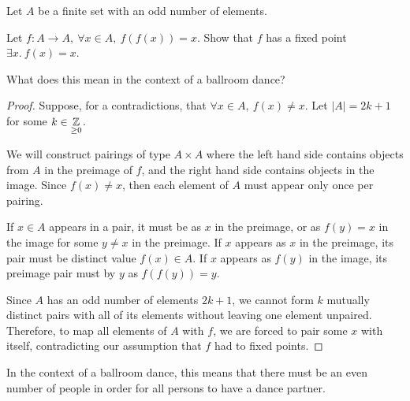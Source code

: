 \documentclass[../hw1]{subfiles}
\begin{document}
\begin{problem}
Let $A$ be a finite set with an odd number of elements.

Let $f:A\longrightarrow A, \ \forall x\in A,\ f(f(x))=x$. Show that $f$ has a fixed point $\exists x.\ f(x)=x$.

What does this mean in the context of a ballroom dance?
\end{problem}
\begin{proof}
	Suppose, for a contradictions, that $\forall x \in A,\ f(x)\neq x$. Let $|A| = 2k+1$ for some $k\in \underset{\ge 0}{\mathbb{Z}}$.

	We will construct pairings of type $A\times A$ where the left hand side contains objects from $A$ in the preimage of  $f$, and the right hand side contains objects in the image. Since $f(x)\neq x$, then each element of $A$ must appear only once per pairing.

	If $x\in A$ appears in a pair, it must be as $x$ in the preimage, or as $f(y)=x$ in the image for some  $y\neq x$ in the preimage. If $x$ appears as  $x$ in the preimage, its pair must be distinct value  $f(x)\in A$. If $x$ appears as  $f(y)$ in the image, its preimage pair must by  $y$ as  $f(f(y))=y$.

	Since $A$ has an odd number of elements  $2k+1$, we cannot form $k$ mutually distinct pairs with all of its elements without leaving one element unpaired. Therefore, to map all elements of $A$ with $f$, we are forced to pair some $x$ with itself, contradicting our assumption that  $f$ had to fixed points.
\end{proof}

In the context of a ballroom dance, this means that there must be an even number of people in order for all persons to have a dance partner.
\end{document}
